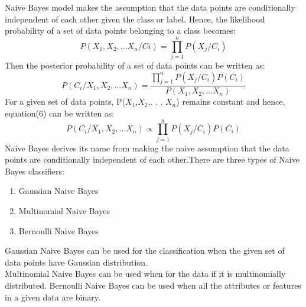 \documentclass[sigconf]{acmart}
\begin{document}
Naive Bayes model makes the assumption that the data points are conditionally independent of each other given the class or label. Hence, the likelihood probability of a set of data points belonging to a class becomes:\cite{Crandall}
\begin{equation}
    P(X_1,X_2,. . . X_n/Ci) = \prod_{j=1}^{n} P(X_j/C_i)
\end{equation}
Then the posterior probability of a set of data points can be written as:
\begin{equation}
    P(C_i/X_1,X_2,. . . X_n) = \frac{\prod_{j=1}^{n} P(X_j/C_i) P(C_i)}{P(X_1,X_2,. . . X_n) }	
\end{equation}
For a given set of data points, P($X_1$,$X_2$,. . . $X_n$) remains constant and hence, equation(6) can be written as:
\begin{equation}
    P(C_i/X_1,X_2,. . . X_n) \propto \prod_{j=1}^{n} P(X_j/C_i) P(C_i)
\end{equation}
Naive Bayes derives its name from making the naive assumption that the data points are conditionally independent of each other.There are three types of Naive Bayes classifiers:\cite{Crandall}
\begin{enumerate}
    \item Gaussian Naive Bayes
    \item Multinomial Naive Bayes
    \item Bernoulli Naive Bayes
\end{enumerate}
Gaussian Naive Bayes can be used for the classification when the given set of data points have Gaussian distribution.\cite{scikit-learn}\\
Multinomial Naive Bayes can be used when for the data if it is multinomially distributed\cite{scikit-learn}.
Bernoulli Naive Bayes can be used when all the attributes or features in a given data are binary\cite{scikit-learn}.
\end{document}
